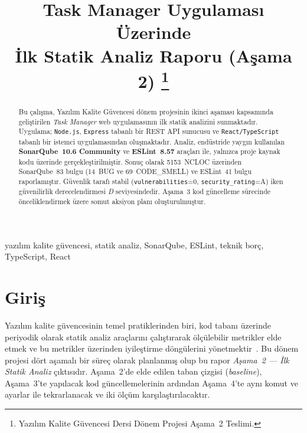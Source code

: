 \documentclass[conference]{IEEEtran}
\begin{document}
\title{Task Manager Uygulaması Üzerinde\\
İlk Statik Analiz Raporu (Aşama 2)%
\thanks{Yazılım Kalite Güvencesi Dersi Dönem Projesi Aşama~2 Teslimi.}}

\author{
}

\maketitle

\begin{abstract}
Bu çalışma, Yazılım Kalite Güvencesi dönem projesinin ikinci
aşaması kapsamında geliştirilen \emph{Task Manager} web uygulamasının ilk
statik analizini sunmaktadır. Uygulama; \texttt{Node.js}, \texttt{Express}
tabanlı bir REST API sunucusu ve \texttt{React/TypeScript} tabanlı bir
istemci uygulamasından oluşmaktadır. Analiz, endüstride yaygın kullanılan
\textbf{SonarQube~10.6 Community} ve \textbf{ESLint~8.57} araçları ile,
yalnızca proje kaynak kodu üzerinde gerçekleştirilmiştir. Sonuç olarak
5153~NCLOC üzerinden SonarQube~83 bulgu (14~BUG ve 69~CODE\_SMELL) ve
ESLint~41 bulgu raporlamıştır. Güvenlik tarafı stabil
(\texttt{vulnerabilities}=0, \texttt{security\_rating}=A) iken
güvenilirlik derecelendirmesi \emph{D} seviyesindedir. Aşama~3 kod
güncelleme sürecinde önceliklendirmek üzere somut aksiyon planı
oluşturulmuştur.
\end{abstract}

\begin{IEEEkeywords}
yazılım kalite güvencesi, statik analiz, SonarQube, ESLint, teknik borç,
TypeScript, React
\end{IEEEkeywords}

\section{Giriş}

Yazılım kalite güvencesinin temel pratiklerinden biri, kod tabanı üzerinde
periyodik olarak statik analiz araçlarını çalıştırarak ölçülebilir
metrikler elde etmek ve bu metrikler üzerinden iyileştirme döngülerini
yönetmektir~\cite{b1,b2}. Bu dönem projesi dört aşamalı bir
süreç olarak planlanmış olup bu rapor \emph{Aşama~2 — İlk Statik Analiz}
çıktısıdır. Aşama~2'de elde edilen taban çizgisi (\emph{baseline}),
Aşama~3'te yapılacak kod güncellemelerinin ardından Aşama~4'te aynı
komut ve ayarlar ile tekrarlanacak ve iki ölçüm karşılaştırılacaktır.
\end{document}
